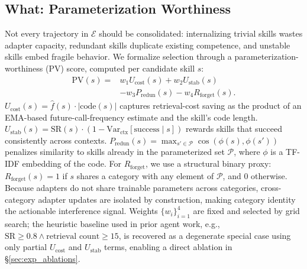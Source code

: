 \documentclass[11pt]{article}
\begin{document}
\subsection{What: Parameterization Worthiness}
Not every trajectory in $\mathcal{E}$ should be consolidated: internalizing trivial skills wastes adapter capacity, redundant skills duplicate existing competence, and unstable skills embed fragile behavior. We formalize selection through a parameterization-worthiness (PV) score, computed per candidate skill $s$:
\begin{equation}
\begin{aligned}
\text{PV}(s) = & w_1 U_{\text{cost}}(s) + w_2 U_{\text{stab}}(s) \\
& - w_3 P_{\text{redun}}(s) - w_4 R_{\text{forget}}(s).
\end{aligned}
\label{eq:pv}
\end{equation}
$U_{\text{cost}}(s)=\hat{f}(s)\cdot |\mathrm{code}(s)|$ captures retrieval-cost saving as the product of an EMA-based future-call-frequency estimate and the skill's code length. $U_{\text{stab}}(s)=\text{SR}(s)\cdot(1-\text{Var}_{\text{ctx}}[\text{success}\mid s])$ rewards skills that succeed consistently across contexts. $P_{\text{redun}}(s)=\max_{s'\in\mathcal{P}}\cos(\phi(s),\phi(s'))$ penalizes similarity to skills already in the parameterized set $\mathcal{P}$, where $\phi$ is a TF-IDF embedding of the code. For $R_{\text{forget}}$, we use a structural binary proxy: $R_{\text{forget}}(s)=1$ if $s$ shares a category with any element of $\mathcal{P}$, and $0$ otherwise. Because adapters do not share trainable parameters across categories, cross-category adapter updates are isolated by construction, making category identity the actionable interference signal. Weights $\{w_i\}_{i=1}^4$ are fixed and selected by grid search; the heuristic baseline used in prior agent work, e.g., $\text{SR}\geq0.8 \land \text{retrieval count}\geq15$, is recovered as a degenerate special case using only partial $U_{\text{cost}}$ and $U_{\text{stab}}$ terms, enabling a direct ablation in \S\ref{sec:exp_ablations}.
\end{document}
